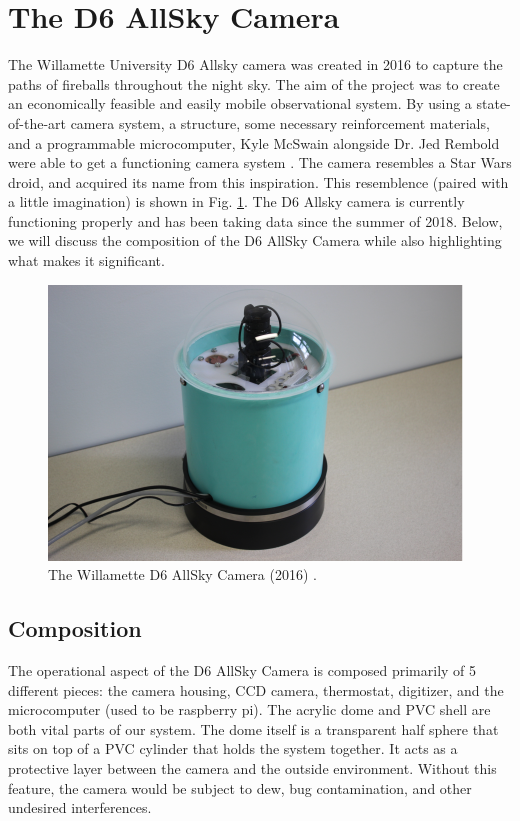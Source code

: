 \section{The D6 AllSky Camera}

The Willamette University D6 Allsky camera was created in 2016 to capture the paths of fireballs throughout the night sky. 
The aim of the project was to create an economically feasible and easily mobile observational system.
By using a state-of-the-art camera system, a structure, some necessary reinforcement materials, and a programmable microcomputer, Kyle McSwain alongside Dr. Jed Rembold were able to get a functioning camera system \cite{mcswain_using_2016}. 
The camera resembles a Star Wars droid, and acquired its name from this inspiration.
This resemblence (paired with a little imagination) is shown in Fig. \ref{droid}.
The D6 Allsky camera is currently functioning properly and has been taking data since the summer of 2018.  
Below, we will discuss the composition of the D6 AllSky Camera while also highlighting what makes it significant.

\begin{figure}[ht!]
  \centering
  \includegraphics[scale=0.7]{images/allsky_camera.png}
  \caption{The Willamette D6 AllSky Camera (2016) \cite{mcswain_using_2016}.}
  \label{droid}
\end{figure}

\subsection{Composition}

The operational aspect of the D6 AllSky Camera is composed primarily of 5 different pieces: the camera housing, CCD camera, thermostat, digitizer, and the microcomputer (used to be raspberry pi).
The acrylic dome and PVC shell are both vital parts of our system. 
The dome itself is a transparent half sphere that sits on top of a PVC cylinder that holds the system together.
It acts as a protective layer between the camera and the outside environment.  
Without this feature, the camera would be subject to dew, bug contamination, and other undesired interferences.

